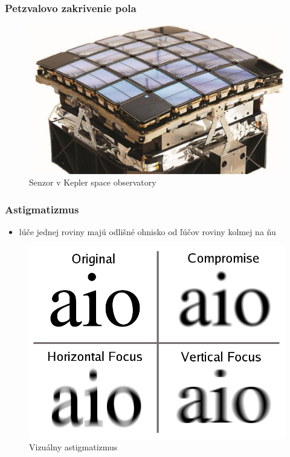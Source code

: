 \documentclass[10pt,xcolor=pdflatex]{beamer}
\begin{document}
\begin{frame}\frametitle{Petzvalovo zakrivenie pola}
        \begin{figure}
            \includegraphics[scale=0.15]{img/kepler.png}
            \caption{Senzor v Kepler space observatory}
        \end{figure}
\end{frame}

\begin{frame}\frametitle{Astigmatizmus}
    \begin{itemize}
        \item lúče jednej roviny majú odlišné ohnisko od ľúčov roviny kolmej na ňu
    \end{itemize}
    \begin{figure}
        \includegraphics[scale=0.20]{img/astigmatism.png}
        \caption{Vizuálny astigmatizmus}
    \end{figure}
\end{frame}
\end{document}
